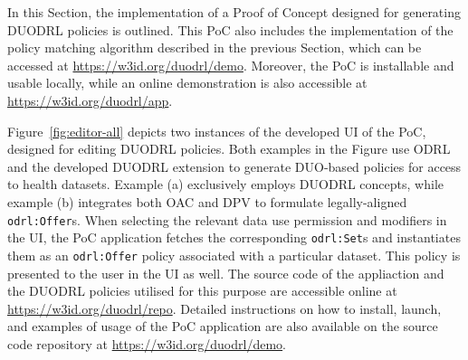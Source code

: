 In this Section, the implementation of a Proof of Concept designed for generating DUODRL policies is outlined.
This PoC also includes the implementation of the policy matching algorithm described in the previous Section, which can be accessed at \url{https://w3id.org/duodrl/demo}.
Moreover, the PoC is installable and usable locally, while an online demonstration is also accessible at \url{https://w3id.org/duodrl/app}.

Figure~\ref{fig:editor-all} depicts two instances of the developed UI of the PoC, designed for editing DUODRL policies.
Both examples in the Figure use ODRL and the developed DUODRL extension to generate DUO-based policies for access to health datasets.
Example (a) exclusively employs DUODRL concepts, while example (b) integrates both OAC and DPV to formulate legally-aligned \texttt{odrl:Offer}s.
When selecting the relevant data use permission and modifiers in the UI, the PoC application fetches the corresponding \texttt{odrl:Set}s and instantiates them as an \texttt{odrl:Offer} policy associated with a particular dataset.
This policy is presented to the user in the UI as well.
The source code of the appliaction and the DUODRL policies utilised for this purpose are accessible online at \url{https://w3id.org/duodrl/repo}.
Detailed instructions on how to install, launch, and examples of usage of the PoC application are also available on the source code repository at \url{https://w3id.org/duodrl/demo}.


